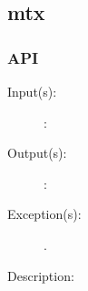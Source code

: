 %
%
%
%
%              

\subsection{mtx}
\label{mtx}

\subsubsection{API}
\begin{description}
\label{mtx_}
\item[{\cfunc[]{mtx\_}{}}: ]
	\begin{description}\item[]
	\item[Input(s): ]
		\begin{description}\item[]
		\item[: ]
		\end{description}
	\item[Output(s): ]
		\begin{description}\item[]
		\item[: ]
		\end{description}
	\item[Exception(s): ]
		\begin{description}\item[]
		\item[.]
		\end{description}
	\item[Description: ]
	\end{description}
\end{description}
